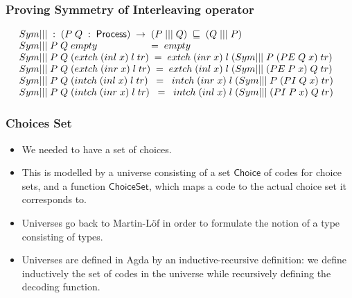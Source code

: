\documentclass{beamer}
\newcommand{\ar}{\rightarrow}
\newcommand{\Process}{\mathsf{Process}}
\newcommand{\Choice}{\mathsf{Choice}}
\newcommand{\ChoiceSet}{\mathsf{ChoiceSet}}
\begin{document}
\begin{frame}

\frametitle{ Proving Symmetry of Interleaving operator }


\[\begin{array}[t]{@{}lcl} 
Sym||| \; : \; (P\; Q\; :\; \Process) \; \ar\; (P \; ||| \; Q) \; \refinedby \; (Q \; ||| \; P)   \\
 
 Sym|||\;  P\; Q\; empty \; \; \; \; \; \; \; \; \; \; \; \; \; \; \; \; \; \; \;  =\; empty \\ 
 Sym|||\; P\; Q\; (extch\; (inl\; x)\; l\; tr)\; =\; extch\; (inr\; x)\; l \; (Sym|||\; P\; (PE\; Q\; x)\; tr) \\
 Sym|||\; P\; Q\; (extch\; (inr\; x)\; l\; tr)\; =\; extch\; (inl\; x)\; l\; (Sym|||\; (PE\; P\; x)\; Q\; tr)\; \\
 Sym|||\; P\; Q\; (intch\; (inl\; x)\; l\; tr)\; \; =\; \; intch\; (inr\; x)\; l\; (Sym|||\; P\; (PI\; Q\; x)\; tr)\; \\
 Sym|||\; P\; Q\; (intch\; (inr\; x)\; l\; tr)\; \; =\; \; intch\; (inl\; x)\; l\; (Sym|||\; (PI\; P\; x)\; Q\; tr) \\
 
\end{array} \]

\end{frame}



\begin{frame}
\frametitle{Choices Set}
\begin{itemize}

\item We needed  to have a set of choices.
\item This is modelled by a universe consisting of a set $\Choice$ of codes for choice sets, and a function
$\ChoiceSet$, which maps a code to the actual choice
set it corresponds to. 

\item Universes go back to Martin-L{\"o}f in order to formulate the notion of a type consisting of types.

\item Universes are defined in Agda by an inductive-recursive definition:
we define inductively the set of codes in the universe while
recursively defining the decoding function.



\end{itemize}
\end{frame}
\end{document}
